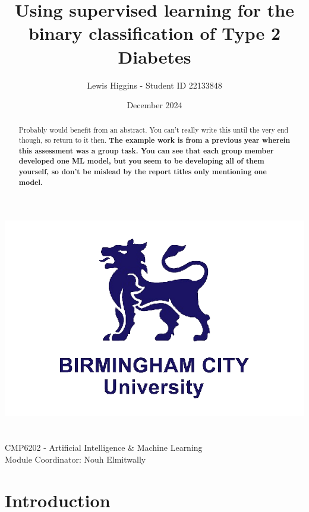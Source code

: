 \documentclass[12pt]{report}
\title{Using supervised learning for the binary classification of Type 2 Diabetes}
\author{Lewis Higgins - Student ID 22133848}
\date{December 2024}
\begin{document}
\makeatletter
\begin{titlepage}
    \begin{center}
        \includegraphics[width=0.7\linewidth]{BCU}\\[4ex]
        {\huge \bfseries  \@title}\\[50ex]
        {\@author}\\[2ex]
        {CMP6202 - Artificial Intelligence \& Machine Learning}\\[2ex]
        {Module Coordinator: Nouh Elmitwally}\\[10ex]
    \end{center}
\end{titlepage}
\makeatother
\thispagestyle{empty}
\newpage


\setcounter{page}{0}


\tableofcontents
\thispagestyle{empty}

\pagecolor{yellow}
\begin{abstract}
    Probably would benefit from an abstract. You can't really write this until the very end though,
    so return to it then. \textbf{The example work is from a previous year wherein this assessment was a group task.
    You can see that each group member developed one ML model, but you seem to be developing all of them yourself, so don't be mislead
    by the report titles only mentioning one model.}
\end{abstract}
\pagecolor{white}

\chapter{Introduction}
\end{document}
